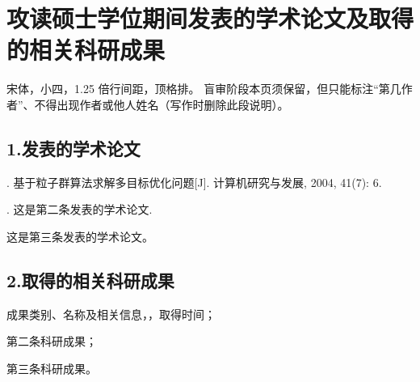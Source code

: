 \chapter*{攻读硕士学位期间发表的学术论文及取得的相关科研成果}
\pagestyle{plain}

宋体，小四，1.25 倍行间距，顶格排。
盲审阶段本页须保留，但只能标注“第几作者”、不得出现作者或他人姓名（写作时删除此段说明）。


\section*{1.发表的学术论文}
\begin{enumerate}[label={[\arabic*]}]
    \item {}. 基于粒子群算法求解多目标优化问题[J]. 计算机研究与发展, 2004, 41(7): 6.
    \item {}. 这是第二条发表的学术论文.
    \item 这是第三条发表的学术论文。
\end{enumerate}
\section*{2.取得的相关科研成果}
\begin{enumerate}[label={[\arabic*]}]
    \item 成果类别、名称及相关信息，，取得时间；
    \item 第二条科研成果；
    \item 第三条科研成果。
\end{enumerate}
